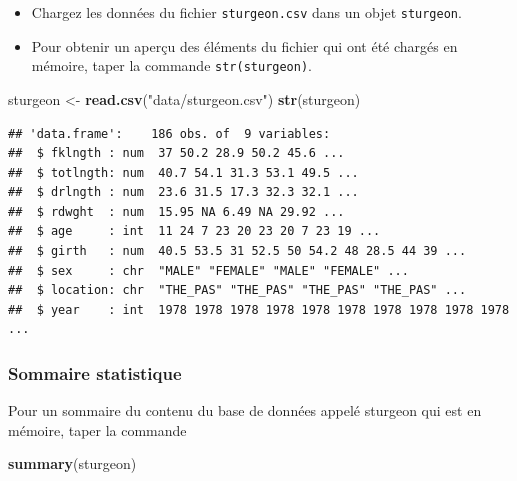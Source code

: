 \documentclass[12pt,]{book}
\newenvironment{Shaded}{\begin{snugshade}}{\end{snugshade}}
\newcommand{\KeywordTok}[1]{\textcolor[rgb]{0.27,0.27,0.27}{\textbf{#1}}}
\newcommand{\NormalTok}[1]{#1}
\newcommand{\StringTok}[1]{\textcolor[rgb]{0.5,0.5,0.5}{#1}}
\providecommand{\tightlist}{%
  \setlength{\itemsep}{0pt}\setlength{\parskip}{0pt}}
\begin{document}
\begin{itemize}
\tightlist
\item
  Chargez les données du fichier \texttt{sturgeon.csv} dans un objet \texttt{sturgeon}.
\item
  Pour obtenir un aperçu des éléments du fichier qui ont été chargés en mémoire, taper la commande \texttt{str(sturgeon)}.
\end{itemize}

\begin{Shaded}
\begin{Highlighting}[]
\NormalTok{sturgeon <-}\StringTok{ }\KeywordTok{read.csv}\NormalTok{(}\StringTok{"data/sturgeon.csv"}\NormalTok{)}
\KeywordTok{str}\NormalTok{(sturgeon)}
\end{Highlighting}
\end{Shaded}

\begin{verbatim}
## 'data.frame':	186 obs. of  9 variables:
##  $ fklngth : num  37 50.2 28.9 50.2 45.6 ...
##  $ totlngth: num  40.7 54.1 31.3 53.1 49.5 ...
##  $ drlngth : num  23.6 31.5 17.3 32.3 32.1 ...
##  $ rdwght  : num  15.95 NA 6.49 NA 29.92 ...
##  $ age     : int  11 24 7 23 20 23 20 7 23 19 ...
##  $ girth   : num  40.5 53.5 31 52.5 50 54.2 48 28.5 44 39 ...
##  $ sex     : chr  "MALE" "FEMALE" "MALE" "FEMALE" ...
##  $ location: chr  "THE_PAS" "THE_PAS" "THE_PAS" "THE_PAS" ...
##  $ year    : int  1978 1978 1978 1978 1978 1978 1978 1978 1978 1978 ...
\end{verbatim}

\hypertarget{sommaire-statistique}{%
\subsubsection{Sommaire statistique}\label{sommaire-statistique}}

Pour un sommaire du contenu du base de données appelé sturgeon qui est en mémoire, taper la commande

\begin{Shaded}
\begin{Highlighting}[]
\KeywordTok{summary}\NormalTok{(sturgeon)}
\end{Highlighting}
\end{Shaded}
\end{document}
